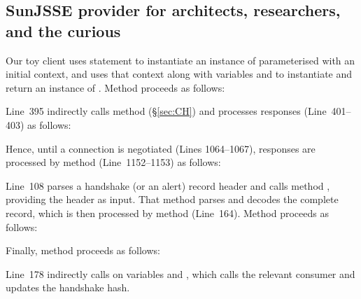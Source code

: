\subsection{SunJSSE provider for architects, researchers, and the curious}\label{sec:SunJSSE}

Our toy client uses statement  
to instantiate an instance of 
 parameterised with an initial context, and uses that 
context along with variables  and  to instantiate and return an 
instance of . Method  proceeds as follows:



\noindent
Line~395 indirectly calls method  (\S\ref{sec:CH}) and processes 
responses (Line~401--403) as follows:



\noindent
Hence, until a connection is negotiated (Lines 1064--1067), responses are processed by 
method  (Line~1152--1153) as follows:



\noindent
Line~108 parses a handshake (or an alert) record header and calls method 
, providing the header as 
input. That method parses and decodes the complete record, which is then 
processed by method  (Line~164).
%
Method  proceeds as follows:



\noindent
Finally, method  proceeds as follows:



\noindent
Line~178 indirectly calls  on variables
 and , which calls the 
relevant consumer and updates the handshake hash.

